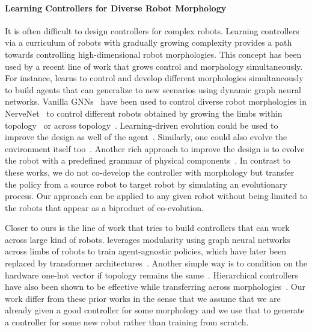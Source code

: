 \documentclass[nohyperref]{article}
\theoremstyle{plain}
\theoremstyle{definition}
\theoremstyle{remark}
\begin{document}
\paragraph{Learning Controllers for Diverse Robot Morphology}
It is often difficult to design controllers for complex robots. Learning controllers via a curriculum of robots with gradually growing complexity provides a path towards controlling high-dimensional robot morphologies. This concept has been used by a recent line of work that grows control and morphology simultaneously. For instance, \citet{pathak2019learning} learns to control and develop different morphologies simultaneously to build agents that can generalize to new scenarios using dynamic graph neural networks. Vanilla GNNs~\cite{scarselli2009graph} have been used to control diverse robot morphologies in NerveNet~\cite{wang2018nervenet} to control different robots obtained by growing the limbs within topology~\cite{wang2019neural,hejna2021task} or across topology~\cite{gupta2021embodied}. Learning-driven evolution could be used to improve the design as well of the agent~\cite{cheney2014unshackling,ha2017joint,ha2018reinforcement,schaff2018jointly,xinlei:evolution}. Similarly, one could also evolve the environment itself too~\cite{wang2019paired}. Another rich approach to improve the design is to evolve the robot with a predefined grammar of physical components~\cite{zhao2020robogrammar}. In contrast to these works, we do not co-develop the controller with morphology but transfer the policy from a source robot to target robot by simulating an evolutionary process. Our approach can be applied to any given robot without being limited to the robots that appear as a biproduct of co-evolution.

Closer to ours is the line of work that tries to build controllers that can work across large kind of robots. \citet{huang2020one} leverages modularity using graph neural networks across limbs of robots to train agent-agnostic policies, which have later been replaced by transformer architectures~\cite{kurin2020my}. 
Another simple way is to condition on the hardware one-hot vector if topology remains the same~\cite{chen2018hardware}. Hierarchical controllers have also been shown to be effective while transferring across morphologies~\cite{hejna2020hierarchically}. 
Our work differ from these prior works in the sense that we assume that we are already given a good controller for some morphology and we use that to generate a controller for some new robot rather than training from scratch.
\end{document}
